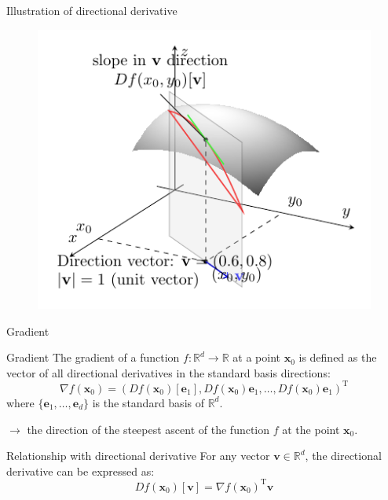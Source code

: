 \documentclass[aspectratio=1610]{beamer}
\begin{document}
\begin{frame}{Illustration of directional derivative}

  \begin{figure}[h]
    \centering
    \includegraphics[height=\textheight]{figures/directional_derivative.pdf}
  \end{figure}

\end{frame}


\begin{frame}{Gradient}

  \begin{block}{Gradient}
    The gradient of a function $f:\mathbb{R}^d \to \mathbb{R}$ at a point $\mathbf{x}_0$ is defined as the vector of all directional derivatives in the standard basis directions:
    $$\nabla f(\mathbf{x}_0) = \left( Df(\mathbf{x}_0)[\mathbf{e}_1], Df(\mathbf{x}_0)\mathbf{e}_1, \ldots, Df(\mathbf{x}_0)\mathbf{e}_1 \right)^\mathrm{T}$$
    where $\{\mathbf{e}_1, \ldots, \mathbf{e}_d\}$ is the standard basis of $\mathbb{R}^d$.
  \end{block}

  $\rightarrow$ the direction of the steepest ascent of the function $f$ at the point $\mathbf{x}_0$.

  \begin{block}{Relationship with directional derivative}
    For any vector $\mathbf{v} \in \mathbb{R}^d$, the directional derivative can be expressed as:
    $$Df(\mathbf{x}_0)[\mathbf{v}] = \nabla f(\mathbf{x}_0)^\mathrm{T} \mathbf{v}$$
  \end{block}

\end{frame}
    
\end{document}
